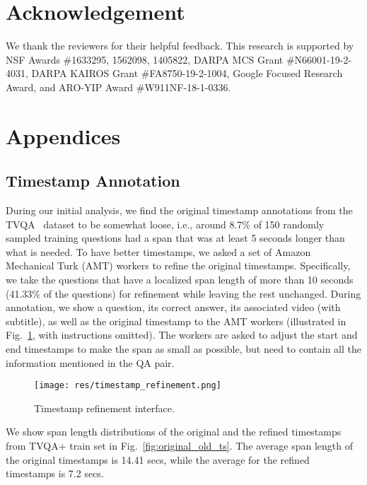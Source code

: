 \documentclass[11pt,a4paper]{article}
\begin{document}
\section*{Acknowledgement}
We thank the reviewers for their helpful feedback. This research is supported by NSF Awards \#1633295, 1562098, 1405822, DARPA MCS Grant \#N66001-19-2-4031, DARPA KAIROS Grant \#FA8750-19-2-1004, Google Focused Research Award, and ARO-YIP Award \#W911NF-18-1-0336.





\appendix
\section{Appendices}\label{sec:appendix}

\subsection{Timestamp Annotation}
During our initial analysis, we find the original timestamp annotations from the TVQA~\cite{lei2018tvqa} dataset to be somewhat loose, i.e., around 8.7\% of 150 randomly sampled training questions had a span that was at least 5 seconds longer than what is needed. To have better timestamps, we asked a set of Amazon Mechanical Turk (AMT) workers to refine the original timestamps. Specifically, we take the questions that have a localized span length of more than 10 seconds (41.33\% of the questions) for refinement while leaving the rest unchanged. During annotation, we show a question, its correct answer, its associated video (with subtitle), as well as the original timestamp to the AMT workers (illustrated in Fig.~\ref{fig:timestamp_interface}, with instructions omitted). The workers are asked to adjust the start and end timestamps to make the span as small as possible, but need to contain all the information mentioned in the QA pair.

\begin{figure}[!ht]
    \centering
  \texttt{[image: res/timestamp\_refinement.png]}
  \caption{Timestamp refinement interface.}
  \label{fig:timestamp_interface}
\end{figure} 

We show span length distributions of the original and the refined timestamps from TVQA+ train set in Fig.~\ref{fig:original_old_ts}. The average span length of the original timestamps is 14.41 secs, while the average for the refined timestamps is 7.2 secs. 
\end{document}
